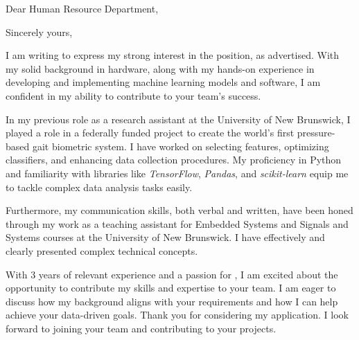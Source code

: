 \documentclass[13pt,letter,Script MT Bold]{moderncv}
\begin{document}
\mobile{ \textbf{\MyPhone}}
\email{\MyEmail}
\homepage{\MyWebsite}
\social[github]{\MyGithub}
\social[linkedin]{\MyLinkedIn}



\clearpage

\date{\today} %
\opening{Dear Human Resource Department,} 
\closing{Sincerely yours,} 

\makelettertitle 

\justify

I am writing to express my strong interest in the \textit{\JobPosition} position, as advertised. With my solid background in hardware, along with my hands-on experience in developing and implementing machine learning models and software, I am confident in my ability to contribute to your team's success.

In my previous role as a research assistant at the University of New Brunswick, I played a role in a federally funded project to create the world's first pressure-based gait biometric system. I have worked on selecting features, optimizing classifiers, and enhancing data collection procedures. My proficiency in Python and familiarity with libraries like \textit{TensorFlow}, \textit{Pandas}, and \textit{scikit-learn} equip me to tackle complex data analysis tasks easily.

Furthermore, my communication skills, both verbal and written, have been honed through my work as a teaching assistant for Embedded Systems and Signals and Systems courses at the University of New Brunswick. I have effectively and clearly presented complex technical concepts.

With 3 years of relevant experience and a passion for \JobPosition, I am excited about the opportunity to contribute my skills and expertise to your team. I am eager to discuss how my background aligns with your requirements and how I can help achieve your data-driven goals. Thank you for considering my application. I look forward to joining your team and contributing to your projects.

\makeletterclosing
\end{document}
